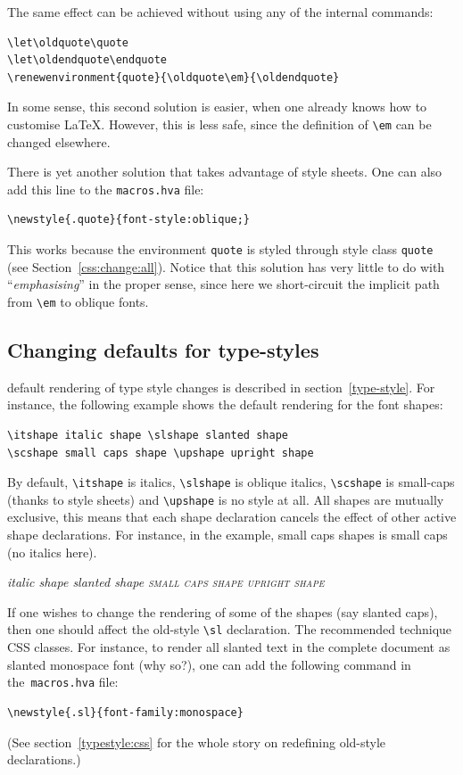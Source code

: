 The same effect can be achieved without using any of the internal
commands:
\begin{verbatim}
\let\oldquote\quote
\let\oldendquote\endquote
\renewenvironment{quote}{\oldquote\em}{\oldendquote}
\end{verbatim}
In some sense, this second 
solution is easier, when one already knows
how to customise \LaTeX{}. However, this is less safe, since the definition of
\verb+\em+ can be changed elsewhere.

There is yet another solution that takes advantage of style sheets.
One can also add this line to the \texttt{macros.hva} file:
\begin{verbatim}
\newstyle{.quote}{font-style:oblique;}
\end{verbatim}
This works because the environment \texttt{quote} is styled through
style class \texttt{quote} (see Section~\ref{css:change:all}).
Notice that this solution has very little to do with
``\emph{emphasising}'' in the proper sense, since here we
short-circuit the implicit path from \verb+\em+ to oblique fonts.


\subsection{Changing defaults for type-styles}\label{customize-style}
\hevea{} default rendering of type style changes is described in
section~\ref{type-style}.
For instance, the following example shows the default rendering
for the font shapes:
\begin{verbatim}
\itshape italic shape \slshape slanted shape
\scshape small caps shape \upshape upright shape
\end{verbatim}
By default, \verb+\itshape+ is italics, \verb+\slshape+ is oblique
italics, \verb+\scshape+ is small-caps (thanks to style sheets) and \verb+\upshape+ is no style at all.
All shapes are mutually exclusive, this means that each shape
declaration cancels the effect of other active shape declarations.
For instance, in the example, small caps shapes is small caps (no italics here).
\begin{htmlonly}
\begin{htmlout}
\itshape italic shape \slshape slanted shape
\scshape small caps shape \upshape upright shape
\end{htmlout}
\end{htmlonly}

If one wishes to change the rendering of some of the shapes (say slanted
caps), then one should affect the old-style \verb+\sl+ declaration.
The recommended technique CSS classes.
For instance, to render all slanted text in the complete document
as slanted monospace font (why so?), one can
add the following command in the~\texttt{macros.hva} file:
\begin{verbatim}
\newstyle{.sl}{font-family:monospace}
\end{verbatim}
(See section~\ref{typestyle:css} for the whole story on redefining
old-style declarations.)

